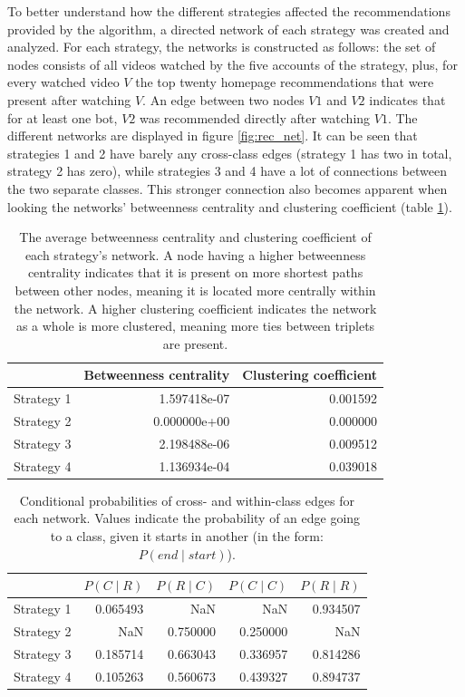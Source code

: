 \documentclass[../main.tex]{subfiles}
\begin{document}
To better understand how the different strategies affected the recommendations provided by the algorithm, a 
directed network of each strategy was created and analyzed. For each strategy, the networks is constructed as 
follows: the set of nodes consists of all videos watched by the five accounts of the strategy, plus, for every 
watched video $V$ the top twenty homepage recommendations that were present after watching $V$. An edge between 
two nodes $V1$ and $V2$ indicates that for at least one bot, $V2$ was recommended directly after watching $V1$. 
The different networks are displayed in figure \ref{fig:rec_net}. It can be seen that strategies
1 and 2 have barely any cross-class edges (strategy 1 has two in total, strategy 2 has zero), while 
strategies 3 and 4 have a lot of connections between the two separate classes. This stronger connection also 
becomes apparent when looking the networks' betweenness centrality and clustering coefficient (table 
\ref{tab:net_metrics}). 

\begin{table}[b]
\centering
\begin{tabular}{lrr}
\toprule
{} &  Betweenness centrality &  Clustering coefficient \\
\midrule
Strategy 1 &            1.597418e-07 &                0.001592 \\
Strategy 2 &            0.000000e+00 &                0.000000 \\
Strategy 3 &            2.198488e-06 &                0.009512 \\
Strategy 4 &            1.136934e-04 &                0.039018 \\
\bottomrule
\end{tabular}
\caption{\label{tab:net_metrics} The average betweenness centrality and clustering coefficient of each strategy's network. A node having a higher betweenness centrality indicates that it is present on more shortest paths between other nodes, meaning it is located more centrally within the network. A higher clustering coefficient indicates the network as a whole is more clustered, meaning more ties between triplets are present.}
\end{table}

\begin{table}
\centering
\begin{tabular}{lrrrr}
\toprule
{} &    $P(C \mid R)$  & $P(R \mid C)$ &    $P(C \mid C)$ &  $P(R \mid R)$ \\
\midrule
Strategy 1 &  0.065493 &       NaN &       NaN &  0.934507 \\
Strategy 2 &       NaN &  0.750000 &  0.250000 &       NaN \\
Strategy 3 &  0.185714 &  0.663043 &  0.336957 &  0.814286 \\
Strategy 4 &  0.105263 &  0.560673 &  0.439327 &  0.894737 \\
\bottomrule
\end{tabular}
\caption[]{\label{tab:cond-probs} Conditional probabilities of cross- and within-class edges for each network. Values indicate the probability of an edge going to a class, given it starts in another (in the form: $P(end \mid start)$).\footnotemark}
\end{table}
\end{document}
